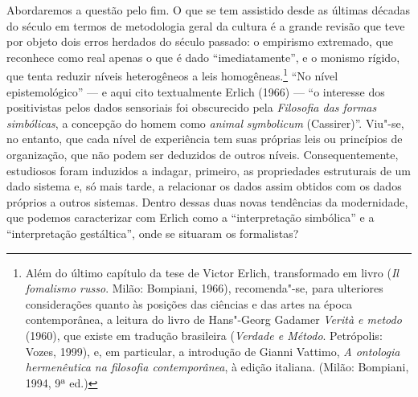 Abordaremos a questão pelo fim. O que se tem assistido desde as últimas
décadas do século  em termos de metodologia geral da cultura é a
grande revisão que teve por objeto dois erros herdados do século
passado: o empirismo extremado, que reconhece como real apenas o que é
dado ``imediatamente'', e o monismo rígido, que tenta reduzir níveis
heterogêneos a leis homogêneas.\footnote{Além do último capítulo da
  tese de Victor Erlich, transformado em livro (\emph{Il fomalismo
  russo}. Milão: Bompiani, 1966), recomenda"-se, para ulteriores
  considerações quanto às posições das ciências e das
  artes na época contemporânea, a leitura do livro de Hans"-Georg Gadamer
  \emph{Verità e metodo} (1960), que existe em tradução brasileira
  (\emph{Verdade e Método}. Petrópolis: Vozes, 1999), e, em particular, a introdução
  de Gianni Vattimo, \emph{A ontologia hermenêutica na filosofia contemporânea}, à edição italiana. (Milão: Bompiani, 1994, 
9ª ed.)} ``No nível epistemológico'' --- e aqui cito textualmente Erlich (1966) --- ``o interesse dos
positivistas pelos dados sensoriais foi obscurecido pela \emph{Filosofia
das formas simbólicas}, a concepção do homem como \emph{animal}
\emph{symbolicum} (Cassirer)''.
Viu"-se, no entanto, que cada nível de experiência tem suas próprias leis ou
princípios de organização, que não podem ser deduzidos de outros níveis.
Consequentemente, estudiosos foram induzidos a indagar, primeiro, as
propriedades estruturais de um dado sistema e, só mais tarde, a
relacionar os dados assim obtidos com os dados próprios a outros
sistemas. Dentro dessas duas novas tendências da modernidade, que
podemos caracterizar com Erlich como a ``interpretação simbólica'' e a
``interpretação gestáltica'', onde se situaram os formalistas?

